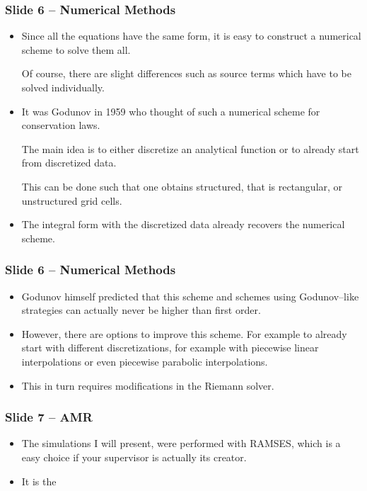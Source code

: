\documentclass{beamer}
\begin{document}
\begin{frame}
 \frametitle{Slide 6 -- Numerical Methods}
 \begin{itemize}
   \item Since all the equations have the same form, it is easy to construct a numerical scheme to solve them all.

   Of course, there are slight differences such as source terms which have to be solved individually.

   \item It was Godunov in 1959 who thought of such a numerical scheme for conservation laws.

   The main idea is to either discretize an analytical function or to already start from discretized data.

   This can be done such that one obtains structured, that is rectangular, or unstructured grid cells.

   \item The integral form with the discretized data already recovers the numerical scheme.
 \end{itemize}
\end{frame}
\begin{frame}
 \frametitle{Slide 6 -- Numerical Methods}
 \begin{itemize}
   \item Godunov himself predicted that this scheme and schemes using Godunov--like strategies can actually never be higher than first order.

   \item However, there are options to improve this scheme. For example to already start with different discretizations, for example with piecewise linear interpolations or even piecewise parabolic interpolations.

   \item This in turn requires modifications in the Riemann solver.
 \end{itemize}
\end{frame}
\begin{frame}
 \frametitle{Slide 7 -- AMR}
 \begin{itemize}
   \item The simulations I will present, were performed with RAMSES, which is a easy choice if your supervisor is actually its creator.

   \item It is the
 \end{itemize}
\end{frame}
\end{document}

